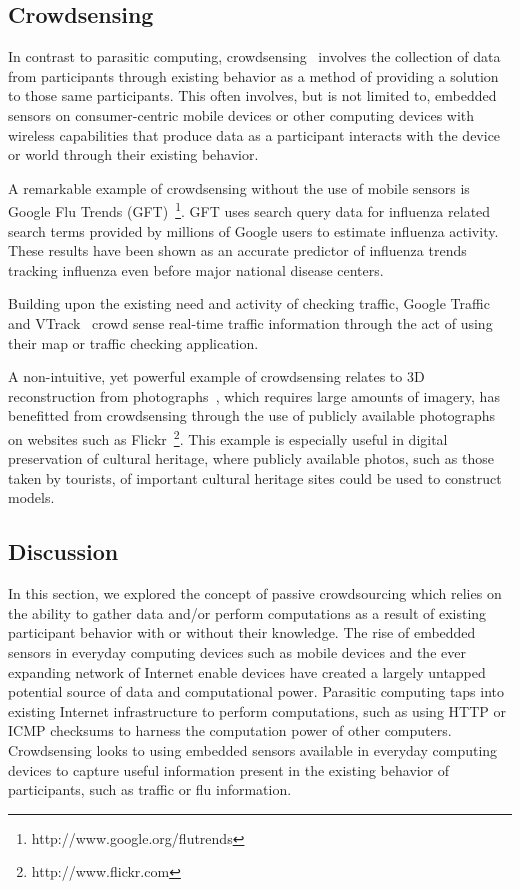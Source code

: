 \documentclass[10pt,twocolumn]{article}
\begin{document}
\subsection{Crowdsensing}
\label{sec:crowdsensing}
In contrast to parasitic computing, crowdsensing~\cite{Ganti2011} 
involves the collection of data from participants through existing 
behavior as a method of providing a solution to those same participants.
This often involves, but is not limited to, embedded sensors on 
consumer-centric mobile devices or other computing devices with wireless 
capabilities that produce data as a participant interacts with the device 
or world through their existing behavior.

A remarkable example of crowdsensing without the use of mobile sensors is
Google Flu Trends (GFT)~\footnote{http://www.google.org/flutrends}. 
GFT uses search query data for influenza related search terms provided 
by millions of Google users to estimate influenza activity. These 
results have been shown as an accurate predictor of influenza 
trends~\cite{Dugas2012} tracking influenza even before 
major national disease centers.

Building upon the existing need and activity of checking
traffic, Google Traffic~\cite{GoogleTraffic} and VTrack~\cite{Thiagarajan2009}
crowd sense real-time traffic information through the act of
using their map or traffic checking application.

A non-intuitive, yet powerful example of crowdsensing relates
to 3D reconstruction from photographs~\cite{Agarwal2009,Frahm2010},
which requires large amounts of imagery, has benefitted from
crowdsensing through the use of publicly available photographs
on websites such as Flickr~\footnote{http://www.flickr.com}. This 
example is especially useful in digital preservation of cultural
heritage, where publicly available photos, such as those taken 
by tourists, of important cultural heritage sites could be used 
to construct models.

\subsection{Discussion}

In this section, we explored the concept of passive crowdsourcing
which relies on the ability to gather data and/or perform computations
as a result of existing participant behavior with or without their
knowledge. The rise of embedded sensors in everyday computing
devices such as mobile devices and the ever expanding network
of Internet enable devices have created a largely untapped potential
source of data and computational power. Parasitic computing taps
into existing Internet infrastructure to perform computations, 
such as using HTTP or ICMP checksums to harness the computation power of 
other computers. Crowdsensing looks to using embedded sensors 
available in everyday computing devices to capture useful information
present in the existing behavior of participants, such as traffic
or flu information.
\end{document}
